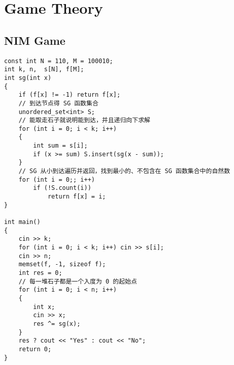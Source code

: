 \section{Game Theory}
\subsection{NIM Game}
\begin{lstlisting}
const int N = 110, M = 100010;
int k, n,  s[N], f[M];
int sg(int x)
{
    if (f[x] != -1) return f[x];
    // 到达节点得 SG 函数集合
    unordered_set<int> S;
    // 能取走石子就说明能到达，并且递归向下求解
    for (int i = 0; i < k; i++)
    {
        int sum = s[i];
        if (x >= sum) S.insert(sg(x - sum));
    }
    // SG 从小到达遍历并返回，找到最小的、不包含在 SG 函数集合中的自然数
    for (int i = 0;; i++)
        if (!S.count(i))
            return f[x] = i;
}

int main()
{
    cin >> k;
    for (int i = 0; i < k; i++) cin >> s[i];
    cin >> n;
    memset(f, -1, sizeof f);
    int res = 0;
    // 每一堆石子都是一个入度为 0 的起始点
    for (int i = 0; i < n; i++)
    {
        int x;
        cin >> x;
        res ^= sg(x);
    }
    res ? cout << "Yes" : cout << "No";
    return 0;
}
\end{lstlisting}
